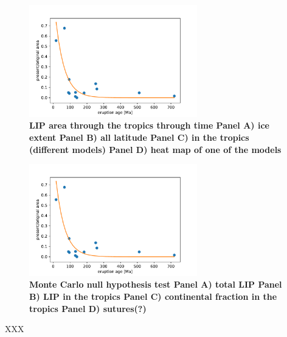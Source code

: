 \documentclass[11pt,letterpaper]{article}
\begin{document}
\begin{figure}[h!]
\begin{center}
	\includegraphics[width=0.65\textwidth]{Manuscript/Figures/LIP_Preservation.pdf}
	\caption{\textbf{LIP area through the tropics through time
Panel A) ice extent
Panel B) all latitude 
Panel C) in the tropics (different models)
Panel D) heat map of one of the models}}
	\label{fig:LIP_area}
\end{center}
\end{figure}

\begin{figure}[h!]
\begin{center}
	\includegraphics[width=0.65\textwidth]{Manuscript/Figures/LIP_Preservation.pdf}
	\caption{\textbf{Monte Carlo null hypothesis test
Panel A) total LIP
Panel B) LIP in the tropics
Panel C) continental fraction in the tropics
Panel D) sutures(?)}}
	\label{fig:LIP_correlation}
\end{center}
\end{figure}




\newpage
\footnotesize

XXX

\singlespacing



\end{document}
